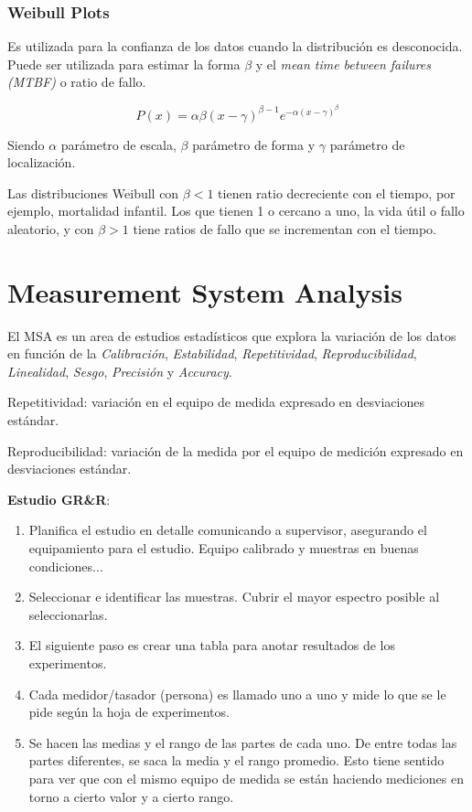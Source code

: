 \documentclass[oneside]{book}
\begin{document}
\subsection{Weibull Plots}

Es utilizada para la confianza de los datos cuando la distribución es desconocida. Puede ser utilizada para estimar la forma $\beta$ y el \textit{mean time between failures (MTBF)} o ratio de fallo.

\begin{equation}
P(x) = \alpha \beta (x-\gamma)^{\beta - 1}e^{-\alpha(x-\gamma)^\beta}
\end{equation}

Siendo $\alpha$ parámetro de escala, $\beta$ parámetro de forma y $\gamma$ parámetro de localización.

Las distribuciones Weibull con $\beta < 1$ tienen ratio decreciente con el tiempo, por ejemplo, mortalidad infantil. Los que tienen 1 o cercano a uno, la vida útil o fallo aleatorio, y con $\beta > 1$ tiene ratios de fallo que se incrementan con el tiempo.

\chapter{Measurement System Analysis}

El MSA es un area de estudios estadísticos que explora la variación de los datos en función de la \textit{Calibración}, \textit{Estabilidad}, \textit{Repetitividad}, \textit{Reproducibilidad}, \textit{Linealidad}, \textit{Sesgo}, \textit{Precisión} y \textit{Accuracy}.

Repetitividad: variación en el equipo de medida expresado en desviaciones estándar. 

Reproducibilidad: variación de la medida por el equipo de medición expresado en desviaciones estándar. 

\textbf{Estudio GR\&R}:
\begin{enumerate}
	\item Planifica el estudio en detalle comunicando a supervisor, asegurando el equipamiento para el estudio. Equipo calibrado y muestras en buenas condiciones... 
	\item Seleccionar e identificar las muestras. Cubrir el mayor espectro posible al seleccionarlas. 
	\item El siguiente paso es crear una tabla para anotar resultados de los experimentos.
	\item Cada medidor/tasador (persona) es llamado uno a uno y mide lo que se le pide según la hoja de experimentos.
	\item Se hacen las medias y el rango de las partes de cada uno. De entre todas las partes diferentes, se saca la media y el rango promedio. Esto tiene sentido para ver que con el mismo equipo de medida se están haciendo mediciones en torno a cierto valor y a cierto rango.
\end{enumerate}
\end{document}
